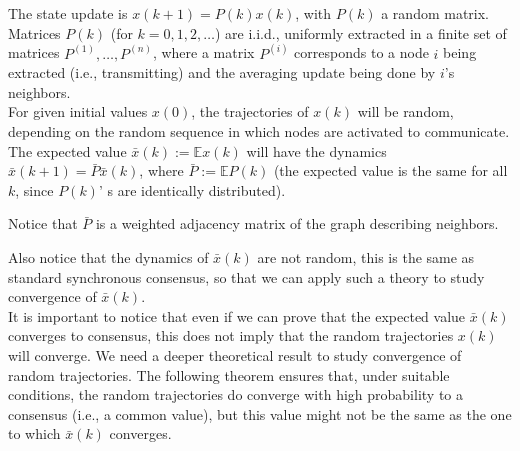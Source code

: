 \documentclass{article}
\begin{document}
The state update is $x(k+1) = P(k) x(k)$, with $P(k)$ a random matrix. Matrices $P(k)$ (for $k=0,1,2,\dots$) are i.i.d., uniformly extracted in a finite set of matrices $P^{(1)}, \dots, P^{(n)}$,  where a matrix $P^{(i)}$ corresponds to a node $i$ being extracted (i.e., transmitting) and the averaging update being done by $i$'s neighbors.\\


For given initial values $x(0)$, the trajectories of $x(k)$  will be random, depending on the random sequence in which nodes are activated to communicate. The expected value $\bar x(k) := \mathbb E x(k)$ will have the dynamics $\bar x(k+1) = \bar P \bar x(k)$, where $\bar P := \mathbb E P(k)$ (the expected value is the same for all $k$, since $P(k)$' s are identically distributed).

Notice that $\bar P$ is a weighted adjacency matrix of the graph describing neighbors.

Also notice that the dynamics of $\bar x(k)$ are not random, this is the same as standard synchronous consensus, so that we can apply such a theory to study convergence of $\bar x(k)$.\\






It is important to notice that even if we can prove that the expected value $\bar x(k)$ converges to consensus, this does not imply that the random trajectories $x(k)$ will converge.
We need a deeper theoretical result to study convergence of random trajectories. The following theorem ensures that, under suitable conditions, the random trajectories do converge with high probability to a consensus (i.e., a common value), but this value might not be the same as the one to which $\bar x(k)$ converges.
\end{document}
